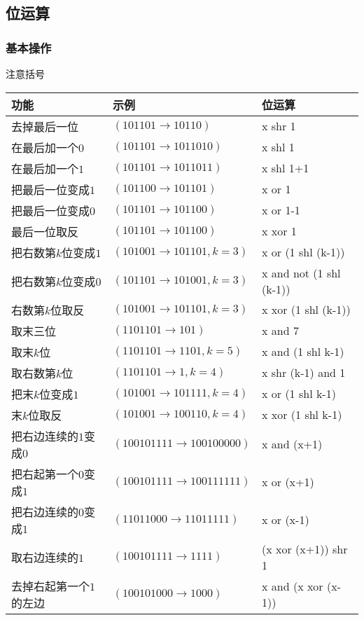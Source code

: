 \subsection{位运算}
    \subsubsection{基本操作}
	注意括号\\
    	\begin{table}[htbp]
	    \centering
	    \begin{tabular}{l|l|l}
		\toprule
		功能 & 示例 & 位运算\\
		\midrule
		去掉最后一位          & $(101101\rightarrow 10110)$           & x shr 1\\
		在最后加一个$0$         & $(101101\rightarrow1011010)$         & x shl 1\\
		在最后加一个$1$         & $(101101\rightarrow1011011)$         & x shl 1+1\\
		把最后一位变成$1$       & $(101100\rightarrow101101)$          & x or 1\\
		把最后一位变成$0$       & $(101101\rightarrow101100)$          & x or 1-1\\
		最后一位取反          & $(101101\rightarrow101100)$          & x xor 1\\
		把右数第$k$位变成$1$      & $(101001\rightarrow101101,k=3)$      & x or (1 shl (k-1))\\
		把右数第$k$位变成$0$      & $(101101\rightarrow101001,k=3)$      & x and not (1 shl (k-1))\\
		右数第$k$位取反         & $(101001\rightarrow101101,k=3)$      & x xor (1 shl (k-1))\\
		取末三位              & $(1101101\rightarrow101)$            & x and 7\\
		取末$k$位               & $(1101101\rightarrow1101,k=5)$       & x and (1 shl k-1)\\
		取右数第$k$位           & $(1101101\rightarrow1,k=4)$          & x shr (k-1) and 1\\
		把末$k$位变成$1$          & $(101001\rightarrow101111,k=4)$      & x or (1 shl k-1)\\
		末$k$位取反             & $(101001\rightarrow100110,k=4)$      & x xor (1 shl k-1)\\
		把右边连续的$1$变成$0$    & $(100101111\rightarrow100100000)$    & x and (x+1)\\
		把右起第一个$0$变成$1$    & $(100101111\rightarrow100111111)$    & x or (x+1)\\
		把右边连续的$0$变成$1$    & $(11011000\rightarrow11011111)$      & x or (x-1)\\
		取右边连续的$1$         & $(100101111\rightarrow1111)$         & (x xor (x+1)) shr 1\\
		去掉右起第一个$1$的左边 & $(100101000\rightarrow1000)$         & x and (x xor (x-1))\\
		\bottomrule
	    \end{tabular}
	\end{table}
	
